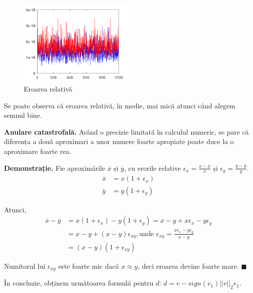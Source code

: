 \documentclass{exam}
\begin{document}
\begin{figure}[ht]
	\centering
	\includegraphics[width=0.5\textwidth]{hbad}
	\caption{Eroarea relativă}
	\label{fig:5}
\end{figure}

Se poate observa că eroarea relativă, în medie, mai mică atunci când alegem
semnul bine.

\textbf{Anulare catastrofală.} Având o precizie limitată în calculul
numeric, se pare că diferența a două aproximari a unor numere foarte apropiate
poate duce la o aproximare foarte rea.

\textbf{Demonstrație.} Fie aproximările $\overline{x}$ și $\overline{y}$,
cu erorile relative $\epsilon_x = \frac{x - \overline{x}}{x}$ și $\epsilon_y = \frac{y - \overline{y}}{y}$.
\begin{align*}
	\overline{x} & = x(1 + \epsilon_x) \\
	\overline{y} & = y(1 + \epsilon_y)
\end{align*}

Atunci,
\begin{align*}
	\overline{x} - \overline{y} & = x(1 + \epsilon_x) - y(1 + \epsilon_y) = x - y + x \epsilon_x - y \epsilon_y                           \\
	                            & = x - y + (x - y) \epsilon_{xy}, \text{unde } \epsilon_{xy} = \frac{x \epsilon_x - y \epsilon_y}{x - y} \\
	                            & = (x - y)(1 + \epsilon_{xy})
\end{align*}

Numitorul lui $\epsilon_{xy}$ este foarte mic dacă $x \approx y$, deci
eroarea devine foarte mare. $\blacksquare$

În concluzie, obținem următoarea formulă pentru $d$: $d = v - sign(v_1) ||v||_2 e_1$.
\end{document}
